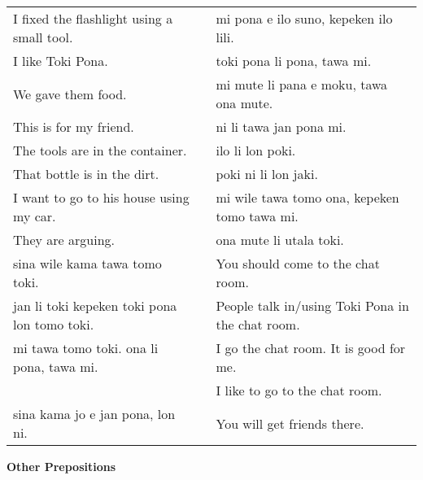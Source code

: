 \begin{supertabular}{p{5,5cm}|ll}
I fixed the flashlight using a small tool.  && mi pona e ilo suno, kepeken ilo lili. \\ %
I like Toki Pona.  && toki pona li pona, tawa mi. \\ %
We gave them food.  && mi mute li pana e moku, tawa ona mute. \\ %
This is for my friend.  && ni li tawa jan pona mi. \\ %
The tools are in the container.  && ilo li lon poki. \\ %
That bottle is in the dirt.  && poki ni li lon jaki. \\ %
I want to go to his house using my car.  && mi wile tawa tomo ona, kepeken tomo tawa mi. \\ %
They are arguing.  && ona mute li  utala toki. \\ %
sina wile kama tawa tomo toki.  && You should come to the chat room. \\
jan li toki kepeken toki pona lon tomo toki.  && People talk in/using Toki Pona in the chat room. \\
mi tawa tomo toki. ona li pona, tawa mi.  && I go the chat room. It is good for me. \\
                                         && I like to go to the chat room. \\ %
sina kama jo e jan pona, lon ni.  && You will get friends there. \\
\end{supertabular} 

\textbf{Other Prepositions} 
\label{'other_prepositions'}

